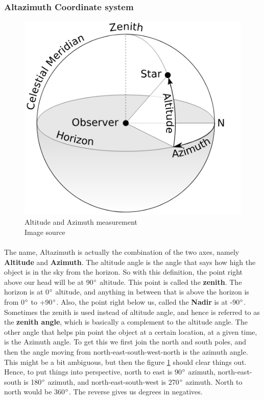 \documentclass[a4paper,twoside]{article}
\numberwithin{equation}{section}
\begin{document}
\subsubsection{Altazimuth Coordinate system}
\begin{figure}
\includegraphics[width=0.9\linewidth]{fig1.png} 
\caption{Altitude and Azimuth measurement \\ Image source \cite{azimuth_wiki}}
\label{fig1}
\end{figure}
\paragraph{}
The name, Altazimuth is actually the combination of the two axes, namely \textbf{Altitude} and \textbf{Azimuth}. The altitude angle is the angle that says how high the object is in the sky from the horizon. So with this definition, the point right above our head will be at 90$\degree$ altitude. This point is called the \textbf{zenith}. The horizon is at 0$\degree$ altitude, and anything in between that is above the horizon is from 0$\degree$ to +90$\degree$. Also, the point right below us, called the \textbf{Nadir} is at -90$\degree$. Sometimes the zenith is used instead of altitude angle, and hence is referred to as the \textbf{zenith angle}, which is basically a complement to the altitude angle. The other angle that helps pin point the object at a certain location, at a given time, is the Azimuth angle. To get this we first join the north and south poles, and then the angle moving from north-east-south-west-north is the azimuth angle. This might be a bit ambiguous, but then the figure \ref{fig1} should clear things out. Hence, to put things into perspective, north to east is 90$\degree$ azimuth, north-east-south is 180$\degree$ azimuth, and north-east-south-west is 270$\degree$ azimuth. North to north would be 360$\degree$. The reverse gives us degrees in negatives. 
\end{document}
